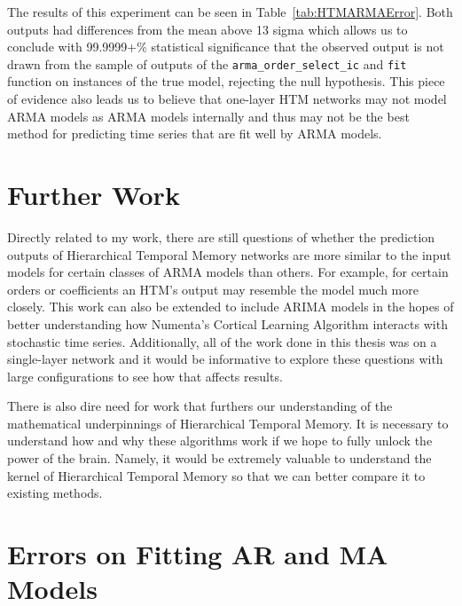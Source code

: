 \documentclass[oneside,12pt,openany]{book}
\begin{document}
	The results of this experiment can be seen in Table~\ref{tab:HTMARMAError}. Both outputs had differences from the mean above 13 sigma which allows us to conclude with 99.9999+\% statistical significance that the observed output is not drawn from the sample of outputs of the \texttt{arma\_order\_select\_ic} and \texttt{fit} function on instances of the true model, rejecting the null hypothesis. This piece of evidence also leads us to believe that one-layer HTM networks may not model ARMA models as ARMA models internally and thus may not be the best method for predicting time series that are fit well by ARMA models.

	
	
	\chapter{Further Work}
	
	Directly related to my work, there are still questions of whether the prediction outputs of Hierarchical Temporal Memory networks are more similar to the input models for certain classes of ARMA models than others. For example, for certain orders or coefficients an HTM's output may resemble the model much more closely. This work can also be extended to include ARIMA models in the hopes of better understanding how Numenta's Cortical Learning Algorithm interacts with stochastic time series. Additionally, all of the work done in this thesis was on a single-layer network and it would be informative to explore these questions with large configurations to see how that affects results.
	
	There is also dire need for work that furthers our understanding of the mathematical underpinnings of Hierarchical Temporal Memory. It is necessary to understand how and why these algorithms work if we hope to fully unlock the power of the brain. Namely, it would be extremely valuable to understand the kernel of Hierarchical Temporal Memory so that we can better compare it to existing methods.
	
	\nocite{*}  %
	{}
	
	\appendices
		\chapter{Errors on Fitting AR and MA Models}\label{app:errors}
		
\end{document}
